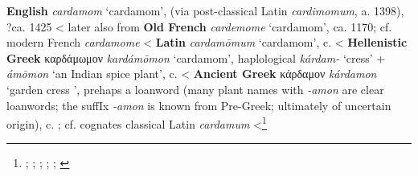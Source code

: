 \begin{etymology}\label{ety:cardamom}
\textbf{English} \textit{cardamom} `cardamom', (via post-classical Latin \textit{cardimomum}, a. 1398), ?ca. 1425
< later also from \textbf{Old French} \textit{cardemome} `cardamom', ca. 1170; cf. modern French \textit{cardamome}
< \textbf{Latin} \textit{cardamōmum} `cardamom',  c. \AD{}
< \textbf{Hellenistic Greek} {καρδάμωμον} \textit{kardámōmon} `cardamom', haplological  \textit{kárdam-} `cress' +  \textit{ámōmon} `an Indian spice plant',  c. \BC{}
< \textbf{Ancient Greek} {κάρδαμον} \textit{kárdamon} `garden cress ', prehaps a loanword (many plant names with \textit{-amon} are clear loanwords; the suffIx \textit{-amon} is known from Pre-Greek; ultimately of uncertain origin),  c. \BC{}; cf. cognates classical Latin \textit{cardamum}
<\footnote{\textcite[s.v. cardamom]{oed}; \textcite[s.v. cardamome]{tlfi}; \textcite[s.v. cardamomum]{lewis_latin_1879}; \textcite[s.v. καρδάμωμον]{liddell_greek-english_1940}; \textcite[s.v. κάρδαμον]{liddell_greek-english_1940}; \textcite[644]{beekes_etymological_2010}}
\end{etymology}
